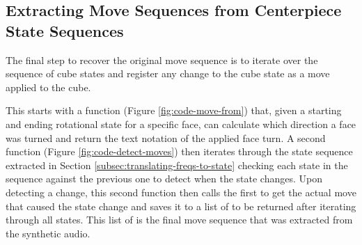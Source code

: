 \newpage
\subsection{Extracting Move Sequences from Centerpiece State Sequences}
\label{subsec:extract-moves}
The final step to recover the original move sequence is to iterate over the sequence of cube states and register any change to the cube state as a move applied to the cube.

This starts with a function (Figure \ref{fig:code-move-from}) that, given a starting and ending rotational state for a specific face, can calculate which direction a face was turned and return the text notation of the applied face turn.
A second function (Figure \ref{fig:code-detect-moves}) then iterates through the state sequence extracted in Section \ref{subsec:translating-freqs-to-state} checking each state in the sequence against the previous one to detect when the state changes.
Upon detecting a change, this second function then calls the first to get the actual move that caused the state change and saves it to a list of  to be returned after iterating through all states.
This list of  is the final move sequence that was extracted from the synthetic audio.


